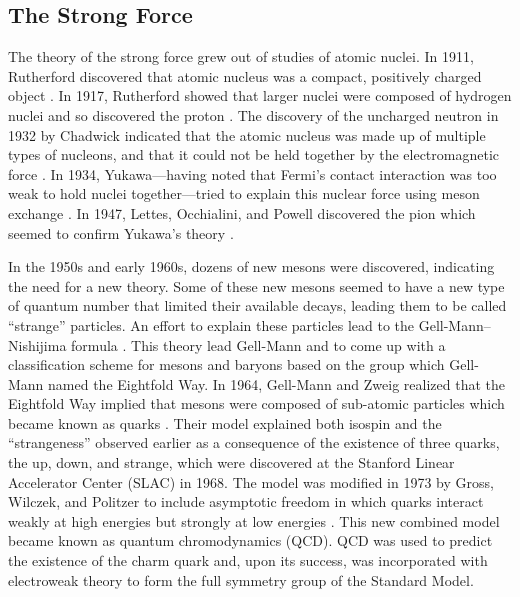 \subsection{The Strong Force}
\label{ssec:strong_force}

The theory of the strong force grew out of studies of atomic nuclei. In 1911,
Rutherford discovered that atomic nucleus was a compact, positively charged
object \cite{rutherford1911}. In 1917, Rutherford showed that larger nuclei
were composed of hydrogen nuclei and so discovered the proton
\cite{rutherford1919}. The discovery of the uncharged neutron in 1932 by
Chadwick indicated that the atomic nucleus was made up of multiple types of
nucleons, and that it could not be held together by the electromagnetic force
\cite{chadwick1932}. In 1934, Yukawa---having noted that Fermi's contact
interaction was too weak to hold nuclei together---tried to explain this
nuclear force using meson exchange \cite{yukawa1935}. In 1947, Lettes,
Occhialini, and Powell discovered the pion which seemed to confirm Yukawa's
theory \cite{lattes1947}.

In the 1950s and early 1960s, dozens of new mesons were discovered, indicating
the need for a new theory. Some of these new mesons seemed to have a new type
of quantum number that limited their available decays, leading them to be
called ``strange'' particles. An effort to explain these particles lead to the
Gell-Mann--Nishijima formula \cite{nakano1953,nishijima1955,gellmann1956}. This
theory lead Gell-Mann and \Neeman to come up with a classification scheme for
mesons and baryons based on the \SUthree group which Gell-Mann named the
Eightfold Way. In 1964, Gell-Mann and Zweig realized that the Eightfold Way
implied that mesons were composed of sub-atomic particles which became known as
quarks \cite{gellmann1964,zweig1964}. Their model explained both isospin and
the ``strangeness'' observed earlier as a consequence of the existence of three
quarks, the up, down, and strange, which were discovered at the Stanford Linear
Accelerator Center (SLAC) in 1968. The model was modified in 1973 by Gross,
Wilczek, and Politzer to include asymptotic freedom in which quarks interact
weakly at high energies but strongly at low energies
\cite{gross_1973,politzer_1973}. This new combined model became known as
quantum chromodynamics (QCD). QCD was used to predict the existence of the
charm quark and, upon its success, was incorporated with electroweak theory to
form the full \SUthreeSUtwoUone symmetry group of the Standard Model.

